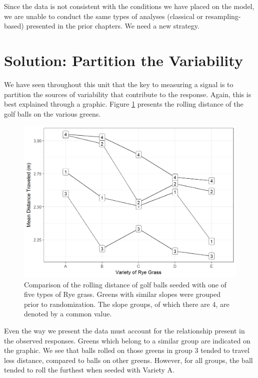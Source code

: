 \documentclass[]{book}
\theoremstyle{definition}
\theoremstyle{definition}
\theoremstyle{remark}
\begin{document}
Since the data is not consistent with the conditions we have placed on
the model, we are unable to conduct the same types of analyses
(classical or resampling-based) presented in the prior chapters. We need
a new strategy.

\section{Solution: Partition the
Variability}\label{solution-partition-the-variability}

We have seen throughout this unit that the key to measuring a signal is
to partition the sources of variability that contribute to the response.
Again, this is best explained through a graphic. Figure
\ref{fig:anovablocking-golf-raw} presents the rolling distance of the
golf balls on the various greens.

\begin{figure}

{\centering \includegraphics[width=0.8\linewidth]{./Images/anovablocking-golf-raw-1} 

}

\caption{Comparison of the rolling distance of golf balls seeded with one of five types of Rye grass.  Greens with similar slopes were grouped prior to randomization.  The slope groups, of which there are 4, are denoted by a common value.}\label{fig:anovablocking-golf-raw}
\end{figure}

Even the way we present the data must account for the relationship
present in the observed responses. Greens which belong to a similar
group are indicated on the graphic. We see that balls rolled on those
greens in group 3 tended to travel less distance, compared to balls on
other greens. However, for all groups, the ball tended to roll the
furthest when seeded with Variety A.
\end{document}
